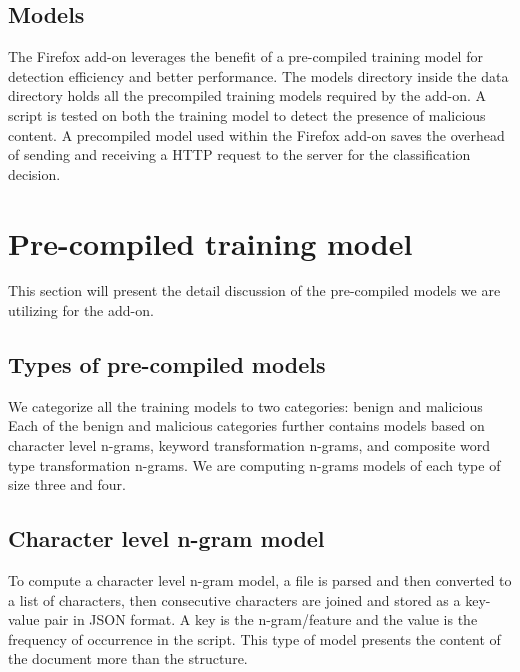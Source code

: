 \subsection{Models}

The Firefox add-on leverages the benefit of a pre-compiled training model for detection efficiency and better performance. The models directory inside the data directory holds all the precompiled training models required by the add-on. A script is tested on both the training model to detect the presence of malicious content. A precompiled model used within the Firefox add-on saves the overhead of sending and receiving a HTTP request to the server for the classification decision.

\section{Pre-compiled training model}

This section will present the detail discussion of the pre-compiled models we are utilizing for the add-on.

\subsection{Types of pre-compiled models}

We categorize all the training models to two categories: benign and malicious
Each of the benign and malicious categories further contains models based on character level n-grams, keyword transformation n-grams, and composite word type transformation n-grams. We are computing n-grams models of each type of size three and four. 

\newpage

\subsection{Character level n-gram model}

To compute a character level n-gram model, a file is parsed and then converted to a list of characters, then consecutive characters are joined and stored as a key-value pair in JSON format. A key is the n-gram/feature and the value is the frequency of occurrence in the script. This type of model presents the content of the document more than the structure.

